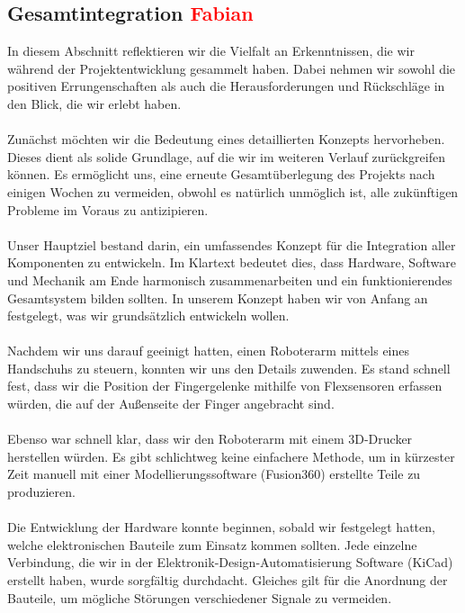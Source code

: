 \documentclass[titlepage,12pt,twoside]{article}
\begin{document}
\subsection{Gesamtintegration \textcolor{red}{Fabian}}
In diesem Abschnitt reflektieren wir die Vielfalt an Erkenntnissen, die wir 
während der Projektentwicklung gesammelt haben. Dabei nehmen wir sowohl die 
positiven Errungenschaften als auch die Herausforderungen und Rückschläge in 
den Blick, die wir erlebt haben. \\
\\
Zunächst möchten wir die Bedeutung eines detaillierten Konzepts hervorheben. 
Dieses dient als solide Grundlage, auf die wir im weiteren Verlauf zurückgreifen 
können. Es ermöglicht uns, eine erneute Gesamtüberlegung des Projekts nach 
einigen Wochen zu vermeiden, obwohl es natürlich unmöglich ist, alle zukünftigen 
Probleme im Voraus zu antizipieren. \\
\\
Unser Hauptziel bestand darin, ein umfassendes Konzept für die Integration 
aller Komponenten zu entwickeln. Im Klartext bedeutet dies, dass Hardware, 
Software und Mechanik am Ende harmonisch zusammenarbeiten und ein funktionierendes 
Gesamtsystem bilden sollten. In unserem Konzept haben wir von Anfang an 
festgelegt, was wir grundsätzlich entwickeln wollen. \\
\\
Nachdem wir uns darauf geeinigt hatten, einen Roboterarm mittels eines 
Handschuhs zu steuern, konnten wir uns den Details zuwenden. Es stand schnell 
fest, dass wir die Position der Fingergelenke mithilfe von Flexsensoren 
erfassen würden, die auf der Außenseite der Finger angebracht sind. \\
\\
Ebenso war schnell klar, dass wir den Roboterarm mit einem 3D-Drucker 
herstellen würden. Es gibt schlichtweg keine einfachere Methode, um in 
kürzester Zeit manuell mit einer Modellierungssoftware (Fusion360) erstellte 
Teile zu produzieren. \\
\\
Die Entwicklung der Hardware konnte beginnen, sobald wir festgelegt hatten, 
welche elektronischen Bauteile zum Einsatz kommen sollten. Jede einzelne 
Verbindung, die wir in der Elektronik-Design-Automatisierung Software (KiCad) 
erstellt haben, wurde sorgfältig durchdacht. Gleiches gilt für die Anordnung 
der Bauteile, um mögliche Störungen verschiedener Signale zu vermeiden. \\
\\
\end{document}
